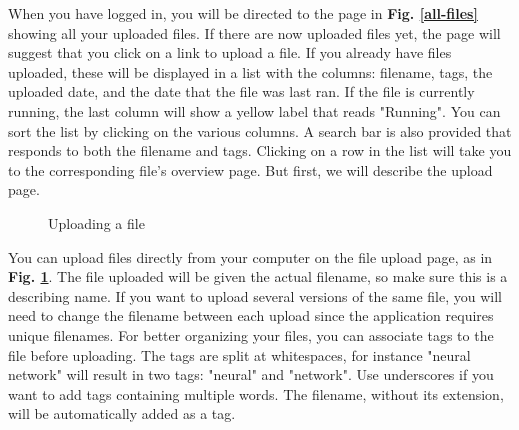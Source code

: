 \noindent When you have logged in, you will be directed to the page in \textbf{Fig. \ref{all-files}} showing all your uploaded files. If there are now uploaded files yet, the page will suggest that you click on a link to upload a file. If you already have files uploaded, these will be displayed in a list with the columns: filename, tags, the uploaded date, and the date that the file was last ran. If the file is currently running, the last column will show a yellow label that reads "Running". You can sort the list by clicking on the various columns. A search bar is also provided that responds to both the filename and tags. Clicking on a row in the list will take you to the corresponding file's overview page. But first, we will describe the upload page. \\


\begin{figure}[h!]
    \centering
        \caption{Uploading a file}
        \label{upload-file}
\end{figure}

\noindent You can upload files directly from your computer on the file upload page, as in \textbf{Fig. \ref{upload-file}}. The file uploaded will be given the actual filename, so make sure this is a describing name. If you want to upload several versions of the same file, you will need to change the filename between each upload since the application requires unique filenames. For better organizing your files, you can associate tags to the file before uploading. The tags are split at whitespaces, for instance "neural network" will result in two tags: "neural" and "network". Use underscores if you want to add tags containing multiple words. The filename, without its extension, will be automatically added as a tag. \\

